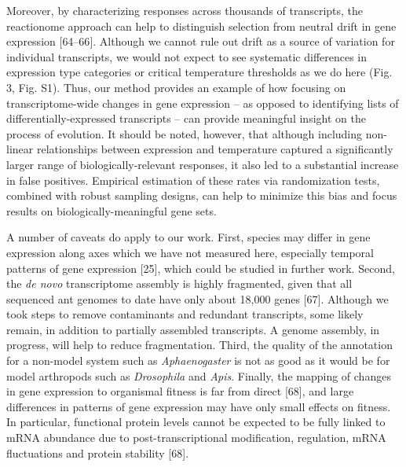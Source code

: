 \documentclass[]{article}
\begin{document}
Moreover, by characterizing responses across thousands of transcripts,
the reactionome approach can help to distinguish selection from neutral
drift in gene expression {[}64--66{]}. Although we cannot rule out drift
as a source of variation for individual transcripts, we would not expect
to see systematic differences in expression type categories or critical
temperature thresholds as we do here (Fig. 3, Fig. S1). Thus, our method
provides an example of how focusing on transcriptome-wide changes in
gene expression -- as opposed to identifying lists of
differentially-expressed transcripts -- can provide meaningful insight
on the process of evolution. It should be noted, however, that although
including non-linear relationships between expression and temperature
captured a significantly larger range of biologically-relevant
responses, it also led to a substantial increase in false positives.
Empirical estimation of these rates via randomization tests, combined
with robust sampling designs, can help to minimize this bias and focus
results on biologically-meaningful gene sets.

A number of caveats do apply to our work. First, species may differ in
gene expression along axes which we have not measured here, especially
temporal patterns of gene expression {[}25{]}, which could be studied in
further work. Second, the \emph{de novo} transcriptome assembly is
highly fragmented, given that all sequenced ant genomes to date have
only about 18,000 genes {[}67{]}. Although we took steps to remove
contaminants and redundant transcripts, some likely remain, in addition
to partially assembled transcripts. A genome assembly, in progress, will
help to reduce fragmentation. Third, the quality of the annotation for a
non-model system such as \emph{Aphaenogaster} is not as good as it would
be for model arthropods such as \emph{Drosophila} and \emph{Apis}.
Finally, the mapping of changes in gene expression to organismal fitness
is far from direct {[}68{]}, and large differences in patterns of gene
expression may have only small effects on fitness. In particular,
functional protein levels cannot be expected to be fully linked to mRNA
abundance due to post-transcriptional modification, regulation, mRNA
fluctuations and protein stability {[}68{]}.
\end{document}
